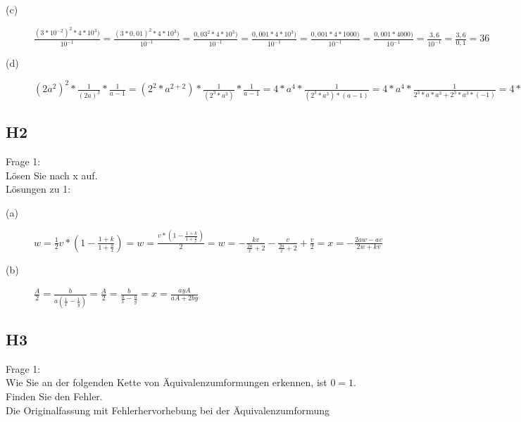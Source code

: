 \documentclass[12pt,a4paper]{article}
\begin{document}
\begin{description}
\item[(c)]{$\frac{(3 * 10^{-2})^2 * 4 * 10^3)}{10^{-1}} = \frac{(3 * 0,01)^2 * 4 * 10^3)}{10^{-1}} = \frac{0,03^2 * 4 * 10^3)}{10^{-1}} = \frac{0,001 * 4 * 10^3)}{10^{-1}} = \frac{0,001 * 4 * 1000)}{10^{-1}} = \frac{0,001 * 4000)}{10^{-1}} = \frac{3,6}{10^{-1}} = \frac{3,6}{0,1} = 36$}
\item[(d)]{$(2a^2)^2 * \frac{1}{(2a)^3} * \frac{1}{a - 1} = (2^2 * a^{2 + 2}) * \frac{1}{(2^3 * a^3)} * \frac{1}{a - 1} = 4 * a^4 * \frac{1}{(2^3 * a^3) * (a - 1)} = 4 * a^4 * \frac{1}{2^3 * a * a^3 + 2^3 * a^3 * (-1)} = 4 * a^4 * \frac{1}{2^3 * a^4 - 2^3 * a^3} = \frac{4 * a^4}{2^3 * a^4 - 2^3 * a^3} = \frac{4a}{8a - 8} = \frac{a}{2a - 2}$}
\end{description}

\subsection{H2}

Frage 1:
\\[2ex]
Lösen Sie nach x auf.
\\[2ex]
Lösungen zu 1:

\begin{description}
\item[(a)]{$w = \frac{1}{2} v * (1 - \frac{1 + k}{1 + \frac{a}{x}}) = w = \frac{v * (1 - \frac{1 + k}{1 + \frac{a}{x}})}{2} = w = - \frac{kv}{\frac{2a}{x} + 2} - \frac{v}{\frac{2a}{x} + 2} + \frac{v}{2} = x = - \frac{2aw - av}{2w + kv}$}
\item[(b)]{$\frac{A}{2} = \frac{b}{a(\frac{1}{x} - \frac{1}{y})} = \frac{A}{2} = \frac{b}{\frac{a}{x} - \frac{a}{y}} = x = \frac{ayA}{aA + 2by}$}
\end{description}

\subsection{H3}

Frage 1:
\\[2ex]
Wie Sie an der folgenden Kette von Äquivalenzumformungen erkennen, ist $0 = 1$. Finden Sie den Fehler.
\\[2ex]
Die Originalfassung mit Fehlerhervorhebung bei der Äquivalenzumformung
\end{document}

